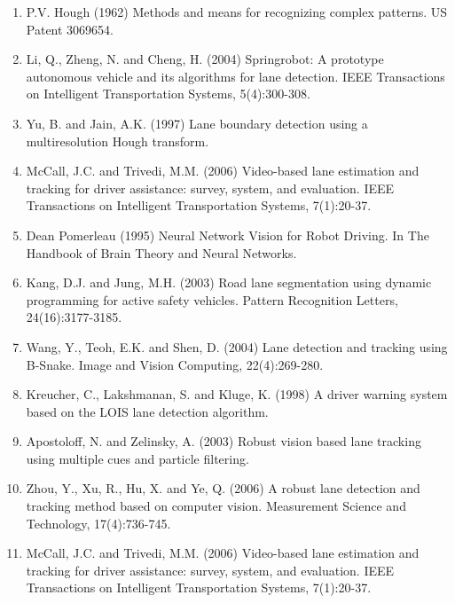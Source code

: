 \documentclass{ws-procs9x6}
\begin{document}
\noindent \begin{enumerate}
\item P.V. Hough (1962) Methods and means for recognizing complex patterns. US Patent 3069654.

\noindent \item Li, Q., Zheng, N. and Cheng, H. (2004) Springrobot: A prototype autonomous vehicle and its algorithms for lane detection. IEEE Transactions on Intelligent Transportation Systems, 5(4):300-308.

\noindent \item Yu, B. and Jain, A.K. (1997) Lane boundary detection using a multiresolution Hough transform.

\noindent \item McCall, J.C. and Trivedi, M.M. (2006) Video-based lane estimation and tracking for driver assistance: survey, system, and evaluation. IEEE Transactions on Intelligent Transportation Systems, 7(1):20-37.

\noindent \item Dean Pomerleau (1995) Neural Network Vision for Robot Driving. In The Handbook of Brain Theory and Neural Networks.

\noindent \item Kang, D.J. and Jung, M.H. (2003) Road lane segmentation using dynamic programming for active safety vehicles. Pattern Recognition Letters, 24(16):3177-3185.

\noindent \item Wang, Y., Teoh, E.K. and Shen, D. (2004) Lane detection and tracking using B-Snake. Image and Vision Computing, 22(4):269-280.

\noindent \item Kreucher, C., Lakshmanan, S. and Kluge, K. (1998) A driver warning system based on the LOIS lane detection algorithm.

\noindent \item Apostoloff, N. and Zelinsky, A. (2003) Robust vision based lane tracking using multiple cues and particle filtering.

\noindent \item Zhou, Y., Xu, R., Hu, X. and Ye, Q. (2006) A robust lane detection and tracking method based on computer vision. Measurement Science and Technology, 17(4):736-745.

\noindent \item McCall, J.C. and Trivedi, M.M. (2006) Video-based lane estimation and tracking for driver assistance: survey, system, and evaluation. IEEE Transactions on Intelligent Transportation Systems, 7(1):20-37.


\end{enumerate}
\end{document}
